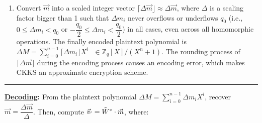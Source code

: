 \begin{tcolorbox}[title={\textbf{\tboxlabel{\ref*{subsec:ckks-encoding-decoding}} CKKS's Encoding and Decoding}}]
\begin{enumerate}
\textcolor{red}{ $\rhd$ where $\omega = e^{i\pi/n} = \cos \left(\dfrac{\pi}{n}\right) + i\sin \left(\dfrac{\pi}{n}\right)$,  $J(h) = 5^h \bmod 2n$,  and  $J_*(h) = -5^h \bmod 2n$}

\small{\noindent $ = \begin{bmatrix}
1 & 1 & \cdots & 1 & 1 & 1 & \cdots & 1\\
(\omega^{J(\frac{n}{2} - 1)}) & (\omega^{J(\frac{n}{2} - 2)}) & \cdots & (\omega^{J(0)}) & (\overline\omega^{J(\frac{n}{2} - 1)}) & (\overline\omega^{J(\frac{n}{2} - 2)}) & \cdots & (\overline\omega^{J(0)})\\
(\omega^{J(\frac{n}{2} - 1)})^2 & (\omega^{J(\frac{n}{2} - 2)})^2 & \cdots & (\omega^{J(0)})^2 & (\overline\omega^{J(\frac{n}{2} - 1)})^2 & (\overline\omega^{J(\frac{n}{2} - 2)})^2 & \cdots & (\overline\omega^{J(0)})^2 \\
\vdots & \vdots & \ddots & \vdots & \vdots & \ddots & \vdots & \vdots \\
(\omega^{J(\frac{n}{2} - 1)})^{n-1} & (\omega^{J(\frac{n}{2} - 2)})^{n-1} & \cdots & (\omega^{J(0)})^{n-1} & (\overline\omega^{J(\frac{n}{2} - 1)})^{n-1} & (\overline\omega^{J(\frac{n}{2} - 2)})^{n-1} & \vdots  & (\overline\omega^{J(0)})^{n-1}
\end{bmatrix}$}

\textcolor{red}{ $\rhd$ because $\omega^{-1} = e^{\frac{-i\pi}{n}} = \overline{e^{\frac{i\pi}{n}}} = \overline\omega$}

$ $

\item Convert $\vec{m}$ into a scaled integer vector $\lceil \Delta\vec{m} \rfloor \approx \Delta \vec{m}$, where $\Delta$ is a scaling factor bigger than 1 such that $\Delta m_i$ never overflows or underflows $q_0$ (i.e., $0 \leq \Delta m_i < q_0$ or $-\dfrac{q_0}{2} \leq \Delta m_i < \dfrac{q_0}{2}$) in all cases, even across all homomorphic operations. The finally encoded plaintext polynomial is $\Delta M = \sum\limits_{i=0}^{n-1} \lceil \Delta m_i \rfloor X^i \text{ } \in \mathbb{Z}_q[X] / (X^n + 1)$. The rounding process of $\lceil \Delta \vec{m} \rfloor$ during the encoding process causes an encoding error, which makes CKKS an approximate encryption scheme.

\end{enumerate}

\par\noindent\rule{\textwidth}{0.4pt}

\textbf{\underline{Decoding}: } From the plaintext polynomial $\Delta M = \sum\limits_{i=0}^{n-1}\Delta m_iX^i$, recover $\vec{m} = \dfrac{\Delta \vec{m}}{\Delta}$. Then,
compute $\vec{v}_{'} = \tilde W^* \cdot \vec{m}$, where:


\end{tcolorbox}
